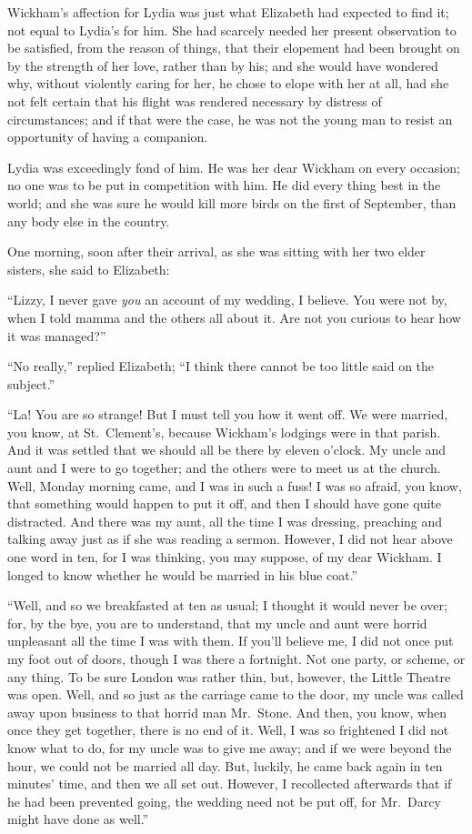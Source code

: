 \documentclass[12pt,english,oneside]{book}
\begin{document}
Wickham's affection for Lydia was just what Elizabeth had expected
to find it; not equal to Lydia's for him. She had scarcely needed
her present observation to be satisfied, from the reason of things,
that their elopement had been brought on by the strength of her love,
rather than by his; and she would have wondered why, without violently
caring for her, he chose to elope with her at all, had she not felt
certain that his flight was rendered necessary by distress of circumstances;
and if that were the case, he was not the young man to resist an opportunity
of having a companion.

Lydia was exceedingly fond of him. He was her dear Wickham on every
occasion; no one was to be put in competition with him. He did every
thing best in the world; and she was sure he would kill more birds
on the first of September, than any body else in the country.

One morning, soon after their arrival, as she was sitting with her
two elder sisters, she said to Elizabeth:

{}``Lizzy, I never gave \textit{you} an account of my wedding, I
believe. You were not by, when I told mamma and the others all about
it. Are not you curious to hear how it was managed?''\ 

{}``No really,'' replied Elizabeth; {}``I think there cannot be
too little said on the subject.''

{}``La! You are so strange! But I must tell you how it went off.
We were married, you know, at St.\ Clement's, because Wickham's lodgings
were in that parish. And it was settled that we should all be there
by eleven o'clock. My uncle and aunt and I were to go together; and
the others were to meet us at the church. Well, Monday morning came,
and I was in such a fuss! I was so afraid, you know, that something
would happen to put it off, and then I should have gone quite distracted.
And there was my aunt, all the time I was dressing, preaching and
talking away just as if she was reading a sermon. However, I did not
hear above one word in ten, for I was thinking, you may suppose, of
my dear Wickham. I longed to know whether he would be married in his
blue coat.''

{}``Well, and so we breakfasted at ten as usual; I thought it would
never be over; for, by the bye, you are to understand, that my uncle
and aunt were horrid unpleasant all the time I was with them. If you'll
believe me, I did not once put my foot out of doors, though I was
there a fortnight. Not one party, or scheme, or any thing. To be sure
London was rather thin, but, however, the Little Theatre was open.
Well, and so just as the carriage came to the door, my uncle was called
away upon business to that horrid man Mr.\ Stone. And then, you know,
when once they get together, there is no end of it. Well, I was so
frightened I did not know what to do, for my uncle was to give me
away; and if we were beyond the hour, we could not be married all
day. But, luckily, he came back again in ten minutes' time, and then
we all set out. However, I recollected afterwards that if he had been
prevented going, the wedding need not be put off, for Mr.\ Darcy
might have done as well.''
\end{document}
